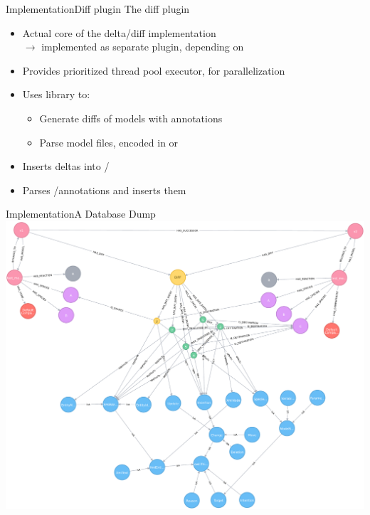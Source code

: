 \begin{frame}{Implementation}{Diff plugin}
	{\Large The diff plugin}
	\\[1.5em]
	\begin{itemize}
		\item Actual core of the delta/diff implementation\\
			$\rightarrow$ implemented as separate plugin, depending on \masymos
		\item Provides prioritized thread pool executor, for parallelization 
		\item Uses \bives library \citep{Scharm2015} to:
		\begin{itemize}
			\item Generate diffs of models with \comodi \citep{Scharm2016} annotations
			\item Parse model files, encoded in \sbml or \cellml
		\end{itemize}
		\item Inserts deltas into \neoj/\masymos
		\item Parses \xml/\rdf \comodi annotations and inserts them
	\end{itemize}
\end{frame}

\begin{frame}{Implementation}{A Database Dump}
	\centering
	\includegraphics[width=\linewidth,height=\textheight,keepaspectratio]{../tex/resources/neo4j-renders/demo-sbml-simple-diff.pdf}
\end{frame}

